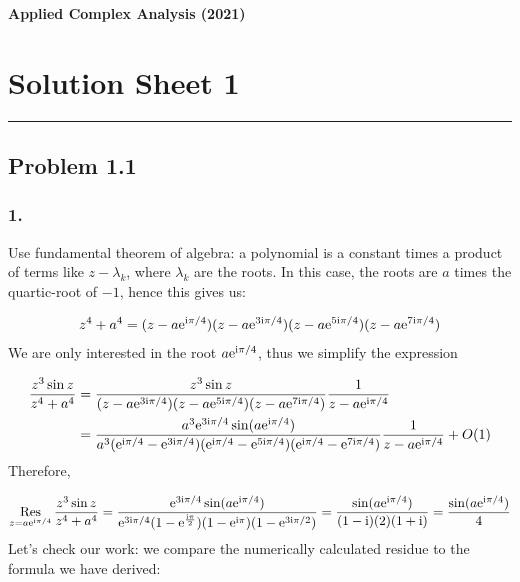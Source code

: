 \documentclass[12pt,landscape]{article}
\def\I{ {\rm i} }
\def\E{ {\rm e} }
\def\Res_#1{\underset{#1}{\rm Res}\,}
\begin{document}
{\LARGE
\sf
\textbf{Applied Complex Analysis (2021)}

\section{Solution Sheet 1}
\rule{\textwidth}{1pt}
\subsection{Problem 1.1}
\newpage
\subsubsection{1.}
Use fundamental theorem of algebra: a polynomial is a constant times a product of terms like $z - \lambda_k$, where $\lambda_k$ are the roots. In this case, the roots are $a$ times the quartic-root of $-1$, hence  this gives us:


\begin{align*}
z^4 + a^4 = (z-a \E^{\I \pi /4})(z-a \E^{3\I \pi /4})(z-a \E^{5\I \pi /4})(z-a \E^{7\I \pi /4})
\end{align*}
We are only interested in the root $a \E^{\I \pi /4}$, thus we simplify the expression


\begin{align*}
{z^3 \sin z \over z^4 + a^4} &= {z^3 \sin z \over (z-a \E^{3\I \pi /4})(z-a \E^{5\I \pi /4})(z-a \E^{7\I \pi /4})} {1 \over z-a \E^{\I \pi /4}} \\
  &= {a^3\E^{3\I \pi /4} \sin(a \E^{\I \pi /4}) \over a^3 (\E^{\I \pi / 4} - \E^{3\I \pi /4})(\E^{\I \pi / 4} - \E^{5\I \pi /4})(\E^{\I \pi / 4} - \E^{7\I \pi /4})} {1 \over z-a \E^{\I \pi /4}} + O(1)
\end{align*}
Therefore,

\[
\Res_{z = a \E^{\I \pi /4}} {z^3 \sin z \over z^4 + a^4} = { \E^{3\I \pi /4} \sin(a \E^{\I \pi /4}) \over \E^{3\I \pi /4} (1 - \E^{\I \pi \over 2})(1 - \E^{\I \pi })(1 - \E^{3\I \pi/2 })}= { \sin(a \E^{\I \pi /4}) \over (1 - \I) (2) (1+ \I)}= { \sin(a \E^{\I \pi /4}) \over 4}
\]
Let's check our work: we compare the numerically calculated residue to the formula we have derived:


}
\end{document}
